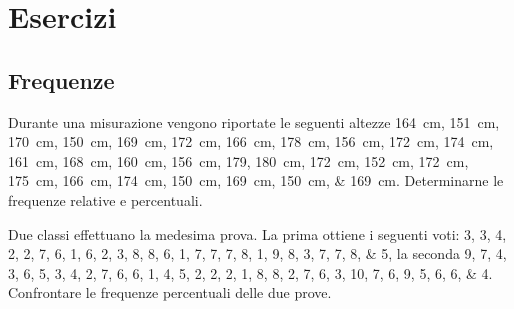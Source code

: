 \chapter{Esercizi}
%
\section{Frequenze}
\begin{eser}
Durante una misurazione vengono riportate le seguenti altezze \SIlist{164; 151; 170;  150; 169; 172; 166; 178; 156; 172; 174; 161; 168; 160; 156; 179,
	180; 172; 152; 172; 175; 166; 174; 150; 169; 150; 169}{\cm}. Determinarne  le frequenze relative e percentuali.
\end{eser}
\begin{eser}
 Due classi effettuano la medesima prova. La prima ottiene i seguenti voti: \numlist{3; 3; 4; 2; 2; 7; 6; 1; 6; 2; 3; 8; 8; 6; 1; 7; 7; 7; 8; 1; 9; 8; 3; 7; 7; 8; 5}, la seconda \numlist{9; 7; 4; 3; 6; 5; 3; 4; 2; 7; 6; 6; 1; 4; 5; 2; 2; 2; 1; 8; 8; 2; 7; 6; 3; 10; 7; 6; 9;
	5; 6; 6; 4}. Confrontare le frequenze percentuali delle due prove.
\end{eser}
